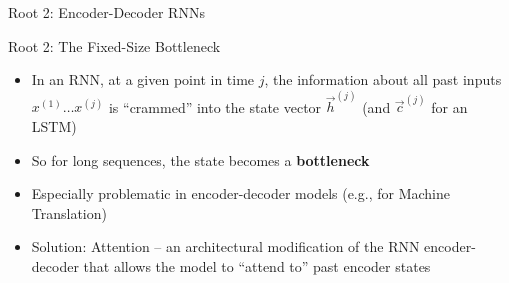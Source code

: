 \begin{frame}{Root 2: Encoder-Decoder RNNs}
\begin{center}
{}\end{center}

\vfill

\end{frame}

\begin{vbframe}{Root 2: The Fixed-Size Bottleneck}

\vfill

\begin{itemize}
	\item In an RNN, at a given point in time $j$, the information about all past inputs $x^{(1)} \ldots x^{(j)}$ is ``crammed'' into the state vector $\vec h^{(j)}$ (and $\vec c^{(j)}$ for an LSTM)
	\item So for long sequences, the state becomes a \textbf{bottleneck}
	\item Especially problematic in encoder-decoder models (e.g., for Machine Translation)
	\item Solution: Attention  -- an architectural modification of the RNN encoder-decoder that allows the model to ``attend to'' past encoder states
\end{itemize}

\vfill

\end{vbframe}

